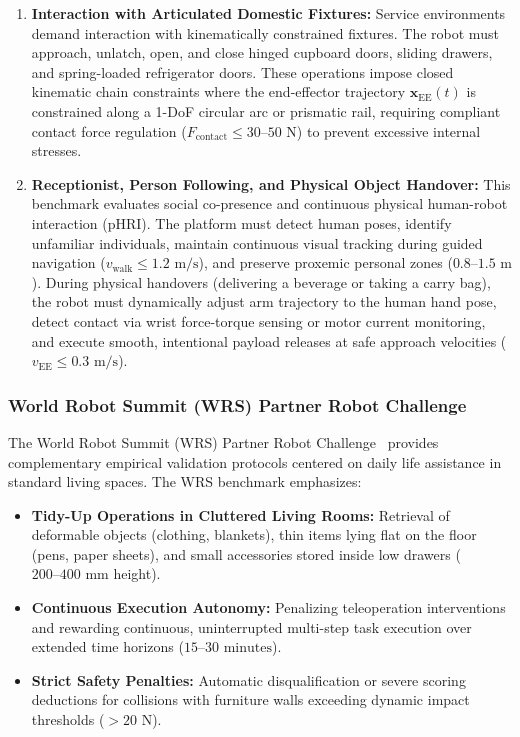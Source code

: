 \begin{enumerate}[leftmargin=1.5em]
  \item \textbf{Interaction with Articulated Domestic Fixtures:} Service environments demand interaction with kinematically constrained fixtures. The robot must approach, unlatch, open, and close hinged cupboard doors, sliding drawers, and spring-loaded refrigerator doors. These operations impose closed kinematic chain constraints where the end-effector trajectory $\mathbf{x}_{\text{EE}}(t)$ is constrained along a 1-DoF circular arc or prismatic rail, requiring compliant contact force regulation ($F_{\text{contact}} \le 30\text{--}50\text{ N}$) to prevent excessive internal stresses.
  
  \item \textbf{Receptionist, Person Following, and Physical Object Handover:} This benchmark evaluates social co-presence and continuous physical human-robot interaction (pHRI). The platform must detect human poses, identify unfamiliar individuals, maintain continuous visual tracking during guided navigation ($v_{\text{walk}} \le 1.2\text{ m/s}$), and preserve proxemic personal zones ($0.8\text{--}1.5\text{ m}$). During physical handovers (delivering a beverage or taking a carry bag), the robot must dynamically adjust arm trajectory to the human hand pose, detect contact via wrist force-torque sensing or motor current monitoring, and execute smooth, intentional payload releases at safe approach velocities ($v_{\text{EE}} \le 0.3\text{ m/s}$).
\end{enumerate}

\subsubsection{World Robot Summit (WRS) Partner Robot Challenge}
The World Robot Summit (WRS) Partner Robot Challenge~\cite{wrs} provides complementary empirical validation protocols centered on daily life assistance in standard living spaces. The WRS benchmark emphasizes:
\begin{itemize}[leftmargin=1.5em]
  \item \textbf{Tidy-Up Operations in Cluttered Living Rooms:} Retrieval of deformable objects (clothing, blankets), thin items lying flat on the floor (pens, paper sheets), and small accessories stored inside low drawers ($200\text{--}400\text{ mm}$ height).
  \item \textbf{Continuous Execution Autonomy:} Penalizing teleoperation interventions and rewarding continuous, uninterrupted multi-step task execution over extended time horizons ($15\text{--}30\text{ minutes}$).
  \item \textbf{Strict Safety Penalties:} Automatic disqualification or severe scoring deductions for collisions with furniture walls exceeding dynamic impact thresholds ($>20\text{ N}$).
\end{itemize}

